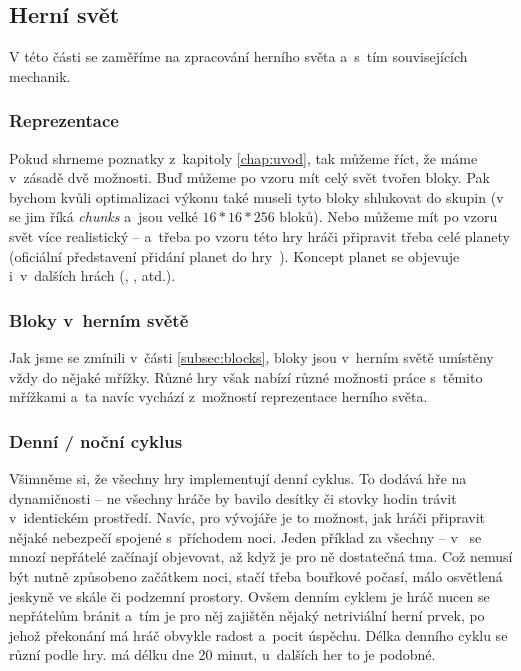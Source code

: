 \subsection{Herní svět}

V této části se zaměříme na zpracování herního světa a~s~tím souvisejících mechanik.

\subsubsection{Reprezentace}

Pokud shrneme poznatky z~kapitoly \ref{chap:uvod}, tak můžeme říct, že máme v~zásadě dvě možnosti. Buď můžeme po vzoru \MC{} mít celý svět tvořen bloky. Pak bychom kvůli optimalizaci výkonu také museli tyto bloky shlukovat do skupin (v  se jim říká \textit{chunks} a~jsou velké $16*16*256$ bloků). Nebo můžeme mít po vzoru \SE{} svět více realistický -- a~třeba po vzoru této hry hráči připravit třeba celé planety (oficiální představení přidání planet do hry~\citep{se_planets}). Koncept planet se objevuje i~v~dalších hrách (\ME{}, \NMS{}, atd.).

\subsubsection{Bloky v~herním světě}

Jak jsme se zmínili v~části \ref{subsec:blocks}, bloky jsou v~herním světě umístěny vždy do nějaké mřížky. Různé hry však nabízí různé možnosti práce s~těmito mřížkami a~ta navíc vychází z~možností reprezentace herního světa.


\subsubsection{Denní / noční cyklus}

Všimněme si, že všechny hry implementují denní cyklus. To dodává hře na dynamičnosti -- ne všechny hráče by bavilo desítky či stovky hodin trávit v~identickém prostředí. Navíc, pro vývojáře je to možnost, jak hráči připravit nějaké nebezpečí spojené s~příchodem noci. Jeden příklad za všechny -- v~ se mnozí nepřátelé začínají objevovat, až když je pro ně dostatečná tma. Což nemusí být nutně způsobeno začátkem noci, stačí třeba bouřkové počasí, málo osvětlená jeskyně ve skále či podzemní prostory. Ovšem denním cyklem je hráč nucen se nepřátelům bránit a~tím je pro něj zajištěn nějaký netriviální herní prvek, po jehož překonání má hráč obvykle radost a~pocit úspěchu.
Délka denního cyklu se různí podle hry. \MC{} má délku dne 20 minut, u~dalších her to je podobné.


